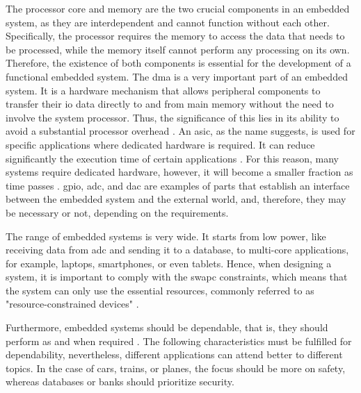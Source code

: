 The processor core and memory are the two crucial components in an embedded system, as they are interdependent and cannot function without each 
other. Specifically, the processor requires the memory to access the data that needs to be processed, while the memory itself cannot perform any 
processing on its own. Therefore, the existence of both components is essential for the development of a functional embedded system. The \gls{dma} 
is a very important part of an embedded system. It is a hardware mechanism that allows peripheral components to transfer their \gls{io} data 
directly to and from main memory without the need to involve the system processor. Thus, the significance of this lies in its ability to avoid 
a substantial processor overhead \cite{LinuxDeviceDrivers}. An \gls{asic}, as the name suggests, is used for specific applications where 
dedicated hardware is required. It can reduce significantly the execution time of certain applications \cite{FPGAaccelaration3} 
\cite{FPGAaccelaration2} \cite{FPGAaccelaration}. For this reason, many systems require dedicated hardware, however, it will become a smaller 
fraction as time passes \cite{camposano1996embedded}. \gls{gpio}, \gls{adc}, and \gls{dac} are examples of parts that establish an interface 
between the embedded system and the external world, and, therefore, they may be necessary or not, depending on the requirements.

The range of embedded systems is very wide. It starts from low power, like receiving data from \gls{adc} and sending it to a database, to 
multi-core applications, for example, laptops, smartphones, or even tablets. Hence, when designing a system, it is important to comply with 
the \gls{swapc} constraints, which means that the system can only use the essential resources, commonly referred to as "resource-constrained 
devices" \cite{swapc}. 

Furthermore, embedded systems should be dependable, that is, they should perform as and when required \cite{iec}. The following characteristics 
must be fulfilled for dependability, nevertheless, different applications can attend better to different topics. In the case of cars, trains, 
or planes, the focus should be more on safety, whereas databases or banks should prioritize security.

